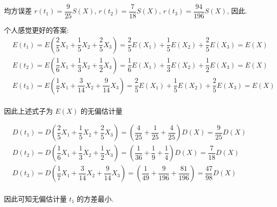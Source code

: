 均方误差 $r(t_1)=\dfrac{9}{25}S(X)$, $r(t_2)=\dfrac{7}{18}S(X)$, $r(t_3)=\dfrac{94}{196}S(X)$, 因此.
\vspace{12pt}

个人感觉更好的答案:\\

$\begin{aligned}
    &E(t_1)=E(\dfrac{2}{5}X_1+\dfrac{1}{5}X_2+\dfrac{2}{5}X_3)=\dfrac{2}{5}E(X_1)+\dfrac{1}{5}E(X_2)+\dfrac{2}{5}E(X_3)=E(X)\\
    &E(t_2)=E(\dfrac{1}{6}X_1+\dfrac{1}{3}X_2+\dfrac{1}{2}X_3)=\dfrac{1}{6}E(X_1)+\dfrac{1}{3}E(X_2)+\dfrac{1}{2}E(X_3)=E(X)\\
    &E(t_3)=E(\dfrac{1}{7}X_1+\dfrac{3}{14}X_2+\dfrac{9}{14}X_3)=\dfrac{2}{5}E(X_1)+\dfrac{1}{5}E(X_2)+\dfrac{2}{5}E(X_3)=E(X)\\
\end{aligned}$

因此上述式子为 $E(X)$ 的无偏估计量

$\begin{aligned}
    &D(t_1)=D(\dfrac{2}{5}X_1+\dfrac{1}{5}X_2+\dfrac{2}{5}X_3)=(\dfrac{4}{25}+\dfrac{1}{25}+\dfrac{4}{25})D(X)=\dfrac{9}{25}D(X)\\
    &D(t_2)=D(\dfrac{1}{6}X_1+\dfrac{1}{3}X_2+\dfrac{1}{2}X_3)=(\dfrac{1}{36}+\dfrac{1}{9}+\dfrac{1}{4})D(X)=\dfrac{7}{18}D(X)\\
    &D(t_3)=D(\dfrac{1}{7}X_1+\dfrac{3}{14}X_2+\dfrac{9}{14}X_3)=(\dfrac{1}{49}+\dfrac{9}{196}+\dfrac{81}{196})=\dfrac{47}{98}D(X)\\
\end{aligned}$

因此可知无偏估计量 $t_1$ 的方差最小.